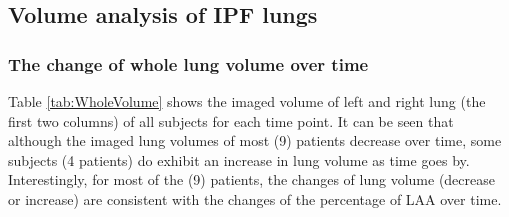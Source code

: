 \subsection{Volume analysis of IPF lungs} \label{VolumeAnalysis}
\subsubsection{The change of whole lung volume over time}
Table \ref{tab:WholeVolume} shows the imaged volume of left and right lung (the first two columns) of all subjects for each time point. It can be seen that although the imaged lung volumes of most (9) patients decrease over time, some subjects (4 patients) do exhibit an increase in lung volume as time goes by. Interestingly, for most of the (9) patients, the changes of lung volume (decrease or increase) are consistent with the changes of the percentage of LAA over time. 

